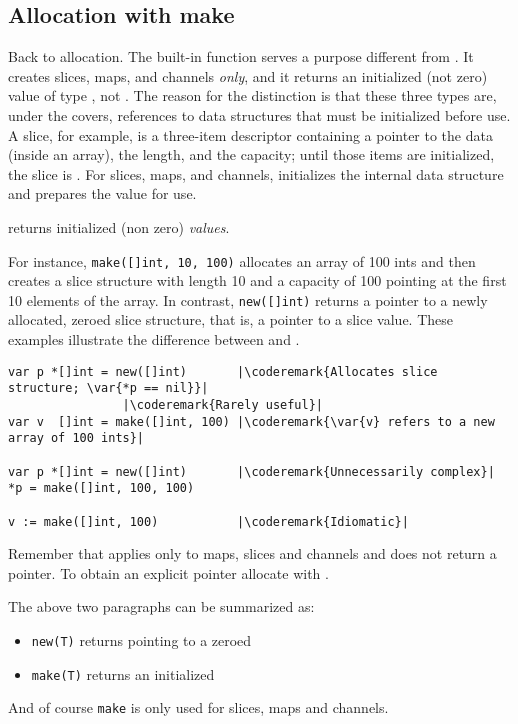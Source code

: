 \subsection{Allocation with make}
\label{sec:allocation with make}
Back to allocation. The built-in function  serves a purpose
different from . It creates slices, maps, and channels \emph{only}, and
it returns an initialized (not zero) value of type , not
. The reason
for the distinction is that these three types are, under the covers,
references to data structures that must be initialized before use. A
slice, for example, is a three-item descriptor containing a pointer to
the data (inside an array), the length, and the capacity; until those
items are initialized, the slice is . For slices, maps, and channels,
 initializes the internal data structure and prepares the value for
use. 

\begin{lbar}[]
 returns initialized (non zero) \emph{values}.
\end{lbar}

For instance,
\lstinline{make([]int, 10, 100)}
allocates an array of 100 ints and then creates a slice structure with
length 10 and a capacity of 100 pointing at the first 10 elements of the
array. In contrast,
\lstinline{new([]int)} returns
a pointer to a newly allocated, zeroed slice structure, that is, a
pointer to a  slice value.
These examples illustrate the difference between  and
.
\begin{lstlisting}
var p *[]int = new([]int)       |\coderemark{Allocates slice structure; \var{*p == nil}}|
				|\coderemark{Rarely useful}|
var v  []int = make([]int, 100) |\coderemark{\var{v} refers to a new array of 100 ints}|

var p *[]int = new([]int)       |\coderemark{Unnecessarily complex}|
*p = make([]int, 100, 100)

v := make([]int, 100)           |\coderemark{Idiomatic}|
\end{lstlisting}
Remember that  applies only to maps, slices and channels and does
not return a pointer. To obtain an explicit pointer allocate with
.

\begin{lbar}
The above two paragraphs can be summarized as:
\begin{itemize}
\item \lstinline{new(T)} returns  pointing to a zeroed 
\item \lstinline{make(T)} returns an initialized 
\end{itemize}
And of course \lstinline{make} is only used for slices, maps and channels.
\end{lbar}


